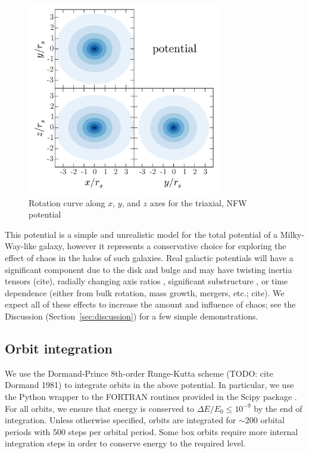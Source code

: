 \documentclass[letterpaper,12pt,preprint]{aastex}
\begin{document}
\begin{figure}[!h]
\begin{center}
\includegraphics[width=0.75\textwidth]{figures/potential.pdf}
\caption{Rotation curve along $x$, $y$, and $z$ axes for the triaxial, NFW potential } \label{fig:potential}
\end{center}
\end{figure}

This potential is a simple and unrealistic model for the total potential of a Milky-Way-like galaxy, however it represents a conservative choice for exploring the effect of chaos in the halos of such galaxies. Real galactic potentials will have a significant component due to the disk and bulge and may have twisting inertia tensors (cite), radially changing axis ratios \citep[e.g.,][]{veraciro11}, significant substructure \citep{zemp09}, or time dependence (either from bulk rotation, mass growth, mergers, etc.; cite). We expect all of these effects to increase the amount and influence of chaos; see the Discussion (Section~\ref{sec:discussion}) for a few simple demonstrations.

\subsection{Orbit integration}\label{sec:integration}

We use the Dormand-Prince 8th-order Runge-Kutta scheme (TODO: cite Dormand 1981) to integrate orbits in the above potential. In particular, we use the Python wrapper to the FORTRAN routines provided in the Scipy package \citep{scipy}. For all orbits, we ensure that energy is conserved to $\Delta E/E_0 \leq 10^{-9}$ by the end of integration. Unless otherwise specified, orbits are integrated for $\sim$200 orbital periods with 500 steps per orbital period. Some box orbits require more internal integration steps in order to conserve energy to the required level. 
\end{document}
